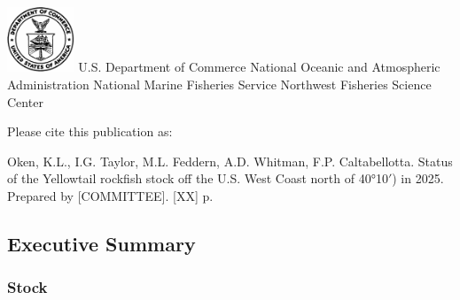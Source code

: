 \documentclass[
]{scrartcl}
\renewcommand*\contentsname{Table of contents}
\newcommand\contentsname{Table of contents}
\begin{document}
\begin{titlepage}
\begin{minipage}[b][\textheight][s]{\textwidth}
  \vspace{1\baselineskip}



  \vfill


  \vspace{1\baselineskip}

  \includegraphics[alt={},width=2cm]{support_files/us_doc_logo.png}\newline %
  U.S. Department of Commerce\newline
  National Oceanic and Atmospheric Administration\newline
  National Marine Fisheries Service\newline
  Northwest Fisheries Science Center\newline

  \end{minipage}
  \restoregeometry
  \end{titlepage}

\renewcommand*\contentsname{Table of contents}
{
\hypersetup{linkcolor=}
\setcounter{tocdepth}{3}
\tableofcontents
}
\listoffigures
\listoftables
\newpage{}

Please cite this publication as:

Oken, K.L., I.G. Taylor, M.L. Feddern, A.D. Whitman, F.P. Caltabellotta.
Status of the Yellowtail rockfish stock off the U.S. West Coast north of
40°10\(\prime\)) in 2025. Prepared by {[}COMMITTEE{]}. {[}XX{]} p.

\newpage{}

\subsection{Executive Summary}\label{executive-summary}

\subsubsection{Stock}\label{stock}
\end{document}
